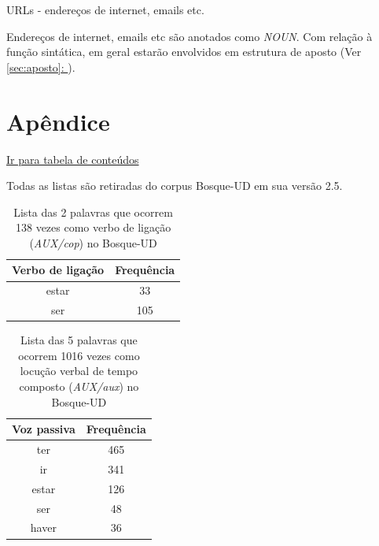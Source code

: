 \documentclass[output=paper,colorlinks,citecolor=brown]{langscibook}
\newcommand*{\fullref}[1]{\hyperref[{#1}]{\autoref*{#1}: \nameref*{#1}}} %
\begin{document}
	URLs - endereços de internet, emails etc.
	
		Endereços de internet, emails etc são anotados como \emph{NOUN}. Com relação à função sintática, em geral estarão envolvidos em estrutura de aposto (Ver \fullref{sec:aposto}).

\chapter{Apêndice}

	\hyperlink{toc}{Ir para tabela de conteúdos\\}

	Todas as listas são retiradas do corpus Bosque-UD em sua versão 2.5.
	
	\begin{table}[]
		\centering
		\begin{tabular}{|c|c|}
			\hline
			\textbf{Verbo de ligação} & \textbf{Frequência} \\\hline
			estar & 33\\\hline
			ser & 105\\\hline
		\end{tabular}
		\caption{Lista das 2 palavras que ocorrem 138 vezes como verbo de ligação (\emph{AUX/cop}) no Bosque-UD}
		\label{tab:verbosdeligacao}
	\end{table}

	\begin{table}[]
		\centering
		\begin{tabular}{|c|c|}
			\hline
			\textbf{Voz passiva} & \textbf{Frequência} \\\hline
			ter & 465\\\hline
			ir & 341\\\hline
			estar & 126\\\hline
			ser & 48\\\hline
			haver & 36\\\hline
		\end{tabular}
		\caption{Lista das 5 palavras que ocorrem 1016 vezes como locução verbal de tempo composto (\emph{AUX/aux}) no Bosque-UD}
		\label{tab:loctempocomposto}
	\end{table}
\end{document}
